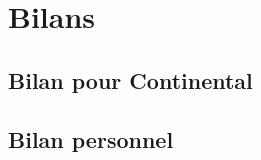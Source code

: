 \chapter{Bilans}
	\lipsum[3]
	\section{Bilan pour Continental}
	\lipsum
	\section{Bilan personnel}
	\lipsum

